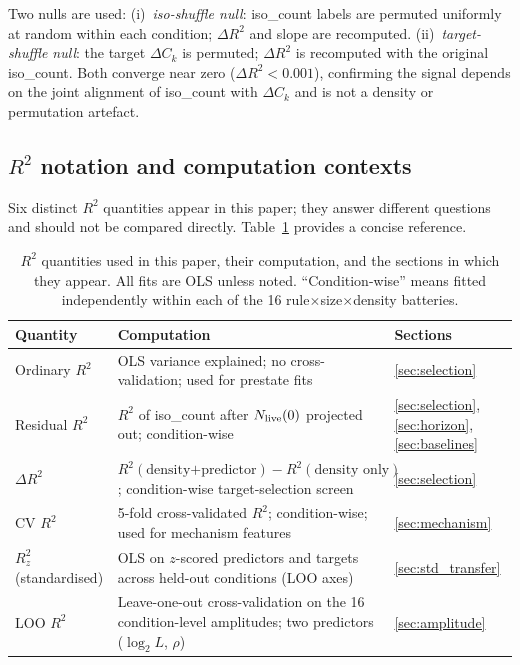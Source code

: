 \documentclass[aip,cha,preprint,nofootinbib]{revtex4-2}
\newcommand{\Ck}{\Delta C_k}
\begin{document}
Two nulls are used:
(i)~\emph{iso-shuffle null}: iso\_count labels are permuted uniformly at
random within each condition; $\Delta R^2$ and slope are recomputed.
(ii)~\emph{target-shuffle null}: the target $\Ck$ is permuted; $\Delta R^2$
is recomputed with the original iso\_count.
Both converge near zero ($\Delta R^2 < 0.001$), confirming the signal
depends on the joint alignment of iso\_count with $\Ck$ and is not
a density or permutation artefact.

\subsection*{$R^2$ notation and computation contexts}

Six distinct $R^2$ quantities appear in this paper; they answer different
questions and should not be compared directly.
Table~\ref{tab:r2notation} provides a concise reference.

\begin{table}[htbp]
\centering
\caption{$R^2$ quantities used in this paper, their computation, and the
sections in which they appear.
All fits are OLS unless noted.
``Condition-wise'' means fitted independently within each of the
16 rule$\times$size$\times$density batteries.}
\label{tab:r2notation}
\begin{tabular}{p{3.0cm}p{5.5cm}l}
\toprule
Quantity & Computation & Sections \\
\midrule
Ordinary $R^2$ &
  OLS variance explained; no cross-validation; used for prestate fits &
  \ref{sec:selection} \\[4pt]
Residual $R^2$ &
  $R^2$ of iso\_count after $N_{\rm live}(0)$ projected out;
  condition-wise &
  \ref{sec:selection}, \ref{sec:horizon},
  \ref{sec:baselines} \\[4pt]
$\Delta R^2$ &
  $R^2(\text{density+predictor}) - R^2(\text{density only})$;
  condition-wise target-selection screen &
  \ref{sec:selection} \\[4pt]
CV $R^2$ &
  5-fold cross-validated $R^2$; condition-wise;
  used for mechanism features &
  \ref{sec:mechanism} \\[4pt]
$R^2_z$ (standardised) &
  OLS on $z$-scored predictors and targets across
  held-out conditions (LOO axes) &
  \ref{sec:std_transfer} \\[4pt]
LOO $R^2$ &
  Leave-one-out cross-validation on the 16 condition-level
  amplitudes; two predictors ($\log_2 L$, $\rho$) &
  \ref{sec:amplitude} \\
\bottomrule
\end{tabular}
\end{table}
\end{document}
